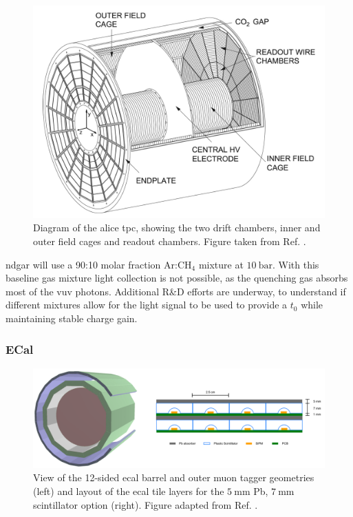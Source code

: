 \begin{figure}[t]
	\centering
	\includegraphics[width=0.7\linewidth]{Images/ND-GAr/alice_tpc}
	\caption[Diagram of the \gls{alice} \gls{tpc}, showing the two drift chambers, inner and outer field cages and readout chambers.]{Diagram of the \gls{alice} \gls{tpc}, showing the two drift chambers, inner and outer field cages and readout chambers. Figure taken from Ref. \cite{DUNE2021NDCDR}.}
	\label{fig:alice_tpc}
\end{figure}

\gls{ndgar} will use a 90:10 molar fraction $\mathrm{Ar}$:$\mathrm{CH}_{4}$ mixture at $10~\mathrm{bar}$. With this baseline gas mixture light collection is not possible, as the quenching gas absorbs most of the \gls{vuv} photons. Additional R\&D efforts are underway, to understand if different mixtures allow for the light signal to be used to provide a $t_{0}$ while maintaining stable charge gain.

\subsubsection{ECal}

\begin{figure}[t]
	\centering
	\includegraphics[width=0.99\linewidth]{Images/ND-GAr/ndgar_ecal}
	\caption[View of the 12-sided \gls{ecal} barrel and outer muon tagger geometries of \gls{ndgar}.]{View of the 12-sided \gls{ecal} barrel and outer muon tagger geometries (left) and layout of the \gls{ecal} tile layers for the $5~\mathrm{mm}$ Pb, $7~\mathrm{mm}$ scintillator option (right). Figure adapted from Ref. \cite{DUNE2021NDCDR}.}
	\label{fig:ndgar_ecal}
\end{figure}

